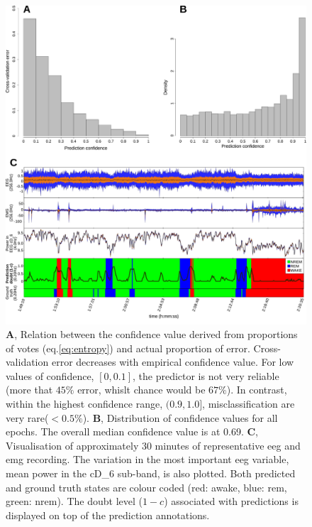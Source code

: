 \begin{figure}[h!]
  \centering    
    \includegraphics[width=1.0\textwidth]{figures/error.pdf}
    \caption{
    \textbf{A}, Relation between the confidence value derived from proportions of votes (eq.\ref{eq:entropy}) and actual proportion of error.
    Cross-validation error decreases with empirical confidence value.
    For low values of confidence, $[0, 0.1]$, the predictor is not very 
    reliable (more that $45\%$ error, whislt chance would be $67\%$).
    In contrast, within the highest confidence range, $(0.9, 1.0]$, misclassification are very rare($<0.5 \%$).
    \textbf{B}, Distribution of confidence values for all epochs. The overall median confidence value is at 0.69.
    \textbf{C}, Visualisation of approximately 30 minutes of representative \gls{eeg} and \gls{emg} recording.
    The variation in the most important \gls{eeg} variable, mean power in the cD\_6 sub-band, is also plotted.
    Both predicted and ground truth states are colour coded (red: awake, blue: \gls{rem}, green: \gls{nrem}).
    The doubt level ($1 - c$) associated with predictions is displayed on top of the prediction annotations.
    \label{fig:error}
  }
\end{figure}
